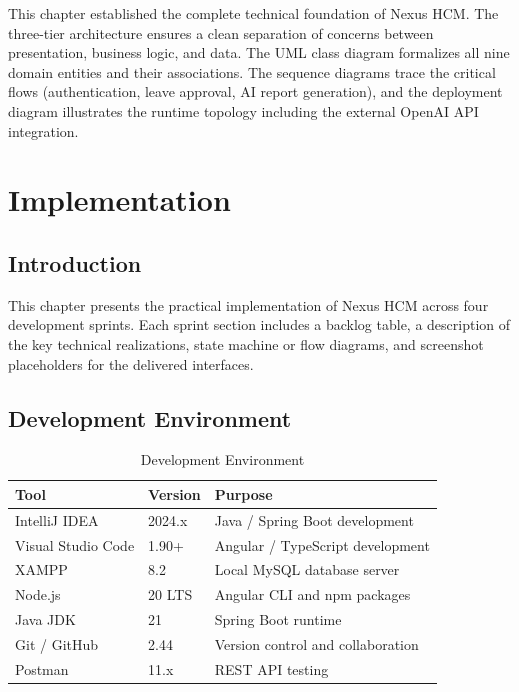 \documentclass[12pt,a4paper]{report}
\begin{document}
This chapter established the complete technical foundation of Nexus HCM. The three-tier
architecture ensures a clean separation of concerns between presentation, business logic,
and data. The UML class diagram formalizes all nine domain entities and their associations.
The sequence diagrams trace the critical flows (authentication, leave approval, AI report
generation), and the deployment diagram illustrates the runtime topology including the
external OpenAI API integration.

\newpage

\chapter{Implementation}

\section{Introduction}

This chapter presents the practical implementation of Nexus HCM across four development
sprints. Each sprint section includes a backlog table, a description of the key technical
realizations, state machine or flow diagrams, and screenshot placeholders for the
delivered interfaces.

\section{Development Environment}

\begin{table}[H]
\centering
\caption{Development Environment}
\label{tab:dev_env}
\begin{tabular}{|C{3.5cm}|C{3.0cm}|L{6.5cm}|}
\hline
{}
\textbf{Tool} & \textbf{Version} & \textbf{Purpose} \\
\hline
IntelliJ IDEA      & 2024.x    & Java / Spring Boot development \\
\hline
Visual Studio Code & 1.90+     & Angular / TypeScript development \\
\hline
XAMPP              & 8.2       & Local MySQL database server \\
\hline
Node.js            & 20 LTS    & Angular CLI and npm packages \\
\hline
Java JDK           & 21        & Spring Boot runtime \\
\hline
Git / GitHub       & 2.44      & Version control and collaboration \\
\hline
Postman            & 11.x      & REST API testing \\
\hline
\end{tabular}
\end{table}
\end{document}
